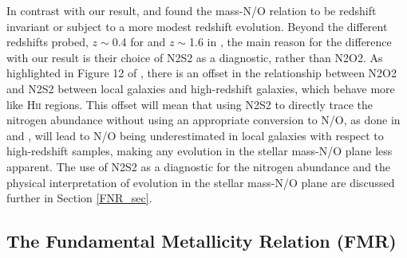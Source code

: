 \documentclass[usenatbib]{mnras} %
\begin{document}
In contrast with our result, 
\cite{Perez-Montero_2013} and \cite{Masters_2016} found the mass-N/O relation to be redshift invariant or subject to a more modest redshift evolution.
Beyond the different redshifts probed, $z\sim$0.4 for \cite{Perez-Montero_2013} and $z\sim$1.6 in \cite{Masters_2016}, the main reason for the difference with our result is their choice of N2S2 as a diagnostic, rather than N2O2. As highlighted in Figure 12 of \cite{Strom_2018}, there is an offset in the relationship between N2O2 and N2S2 between local galaxies and high-redshift galaxies, which behave more like \textsc{Hii} regions. This offset will mean that using N2S2 to directly trace the nitrogen abundance without using an appropriate conversion to N/O, as done in \cite{Masters_2016} and \cite{Kashino_2017}, will lead to N/O being underestimated in local galaxies with respect to high-redshift samples, making any evolution in the stellar mass-N/O plane less apparent. The use of N2S2 as a diagnostic for the nitrogen abundance and the physical interpretation of evolution in the stellar mass-N/O plane are discussed further in Section \ref{FNR_sec}.




\subsection{The Fundamental Metallicity Relation (FMR)}
\end{document}
